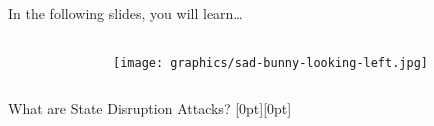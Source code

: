 \begin{frame}[light]{In the following slides, you will learn…}
\begin{columns}[fullwidth]
\begin{column}{.20\linewidth}
    \vspace{0.4cm}
  \end{column}
  \begin{column}{.20\linewidth}
    \vspace{1.6cm}
    \texttt{[image: graphics/sad-bunny-looking-left.jpg]}
  \end{column}
\end{columns}
\end{frame}


\begin{frame}{What are State Disruption Attacks?}
  \raisebox{0pt}[0pt][0pt]{
    \begin{minipage}{\textwidth}
      \vspace{2.2cm}
      \begin{columns}[T,fullwidth]
        \begin{column}{.325\linewidth}

\end{column}
\end{columns}
\end{minipage}}
\end{frame}
